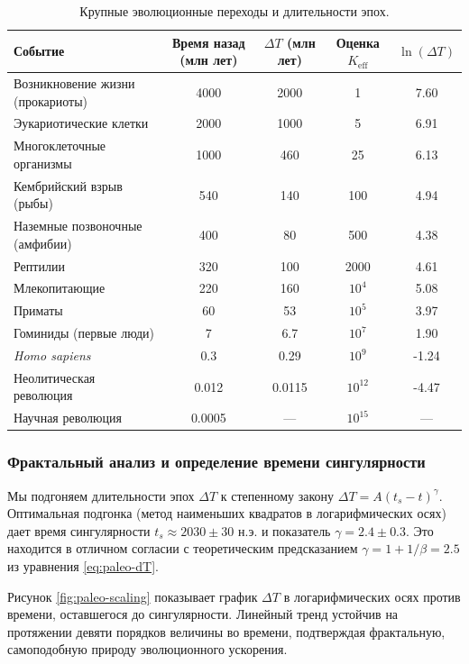 \documentclass[12pt,a4paper]{article}
\theoremstyle{remark}
\begin{document}
	\begin{table}[htbp]
		\centering
		\caption{Крупные эволюционные переходы и длительности эпох.}
		\label{tab:evolutionary-epochs}
		\footnotesize \begin{tabular}{l c c c c}
			\toprule
			\textbf{Событие} & \textbf{Время назад (млн лет)} & $\Delta T$ (млн лет) & Оценка $K_{\mathrm{eff}}$ & $\ln(\Delta T)$ \\
			\midrule
			Возникновение жизни (прокариоты) & 4000 & 2000 & 1 & 7.60 \\
			Эукариотические клетки & 2000 & 1000 & 5 & 6.91 \\
			Многоклеточные организмы & 1000 & 460 & 25 & 6.13 \\
			Кембрийский взрыв (рыбы) & 540 & 140 & 100 & 4.94 \\
			Наземные позвоночные (амфибии) & 400 & 80 & 500 & 4.38 \\
			Рептилии & 320 & 100 & 2000 & 4.61 \\
			Млекопитающие & 220 & 160 & \(10^4\) & 5.08 \\
			Приматы & 60 & 53 & \(10^5\) & 3.97 \\
			Гоминиды (первые люди) & 7 & 6.7 & \(10^7\) & 1.90 \\
			\emph{Homo sapiens} & 0.3 & 0.29 & \(10^9\) & -1.24 \\
			Неолитическая революция & 0.012 & 0.0115 & \(10^{12}\) & -4.47 \\
			Научная революция & 0.0005 & --- & \(10^{15}\) & --- \\
			\bottomrule
		\end{tabular}
	\end{table}
	
	\subsubsection{Фрактальный анализ и определение времени сингулярности}
	
	Мы подгоняем длительности эпох $\Delta T$ к степенному закону $\Delta T = A (t_s - t)^{\gamma}$. Оптимальная подгонка (метод наименьших квадратов в логарифмических осях) дает время сингулярности $t_s \approx 2030 \pm 30$ н.э. и показатель $\gamma = 2.4 \pm 0.3$. Это находится в отличном согласии с теоретическим предсказанием $\gamma = 1 + 1/\beta = 2.5$ из уравнения \eqref{eq:paleo-dT}.
	
	Рисунок \ref{fig:paleo-scaling} показывает график $\Delta T$ в логарифмических осях против времени, оставшегося до сингулярности. Линейный тренд устойчив на протяжении девяти порядков величины во времени, подтверждая фрактальную, самоподобную природу эволюционного ускорения.
	
\end{document}
